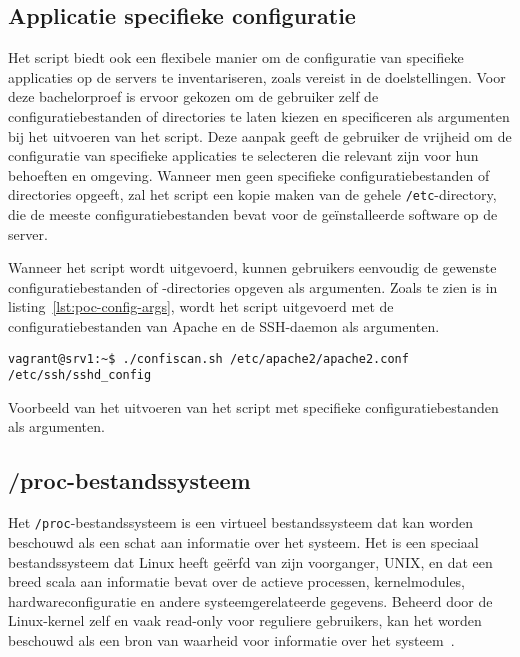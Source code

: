 \subsection{Applicatie specifieke configuratie}
\label{poc_functionaliteiten_app_config}

Het script biedt ook een flexibele manier om de configuratie van specifieke applicaties op de servers te inventariseren, zoals vereist in de doelstellingen.
Voor deze bachelorproef is ervoor gekozen om de gebruiker zelf de configuratiebestanden of directories te laten kiezen en specificeren als argumenten bij het uitvoeren van het script.
Deze aanpak geeft de gebruiker de vrijheid om de configuratie van specifieke applicaties te selecteren die relevant zijn voor hun behoeften en omgeving.
Wanneer men geen specifieke configuratiebestanden of directories opgeeft, zal het script een kopie maken van de gehele \texttt{/etc}-directory, die de meeste configuratiebestanden bevat voor de ge\"installeerde software op de server.

Wanneer het script wordt uitgevoerd, kunnen gebruikers eenvoudig de gewenste configuratiebestanden of -directories opgeven als argumenten.
Zoals te zien is in listing~\ref{lst:poc-config-args}, wordt het script uitgevoerd met de configuratiebestanden van Apache en de SSH-daemon als argumenten.

\begin{listing}
  \begin{verbatim}
vagrant@srv1:~$ ./confiscan.sh /etc/apache2/apache2.conf /etc/ssh/sshd_config
  \end{verbatim}
  \caption{Voorbeeld van het uitvoeren van het script met specifieke configuratiebestanden als argumenten.}
  \label{lst:poc-config-args}
\end{listing}

\subsection{/proc-bestandssysteem}
\label{poc_functionaliteiten_proc}

Het \texttt{/proc}-bestandssysteem is een virtueel bestandssysteem dat kan worden beschouwd als een schat aan informatie over het systeem.
Het is een speciaal bestandssysteem dat Linux heeft ge\"erfd van zijn voorganger, UNIX, en dat een breed scala aan informatie bevat over de actieve processen, kernelmodules, hardwareconfiguratie en andere systeemgerelateerde gegevens.
Beheerd door de Linux-kernel zelf en vaak read-only voor reguliere gebruikers, kan het worden beschouwd als een bron van waarheid voor informatie over het systeem~\autocite{rhel-proc}.

